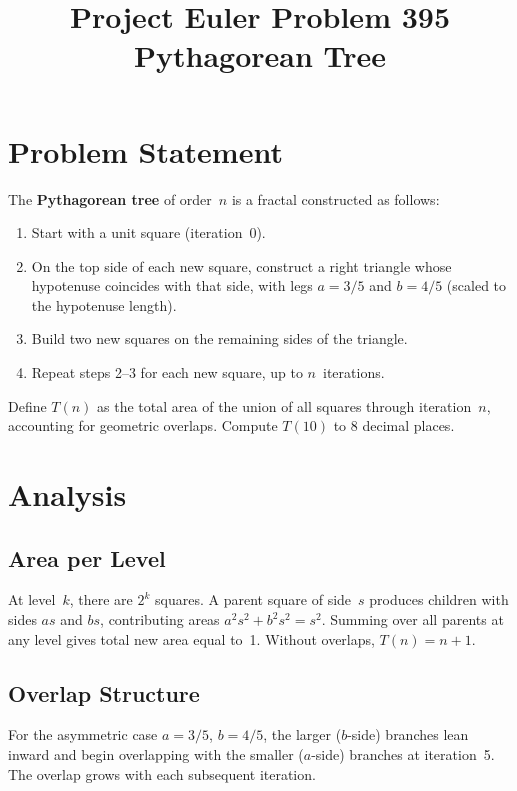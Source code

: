 \documentclass[11pt]{article}
\title{Project Euler Problem 395\\Pythagorean Tree}
\author{}
\date{}
\begin{document}
\maketitle

\section{Problem Statement}

The \textbf{Pythagorean tree} of order~$n$ is a fractal constructed as follows:
\begin{enumerate}
    \item Start with a unit square (iteration~0).
    \item On the top side of each new square, construct a right triangle whose
          hypotenuse coincides with that side, with legs $a = 3/5$ and $b = 4/5$
          (scaled to the hypotenuse length).
    \item Build two new squares on the remaining sides of the triangle.
    \item Repeat steps 2--3 for each new square, up to $n$~iterations.
\end{enumerate}

Define $T(n)$ as the total area of the union of all squares through
iteration~$n$, accounting for geometric overlaps. Compute $T(10)$ to 8
decimal places.

\section{Analysis}

\subsection{Area per Level}

At level~$k$, there are $2^k$ squares. A parent square of side~$s$ produces
children with sides $as$ and $bs$, contributing areas $a^2 s^2 + b^2 s^2 = s^2$.
Summing over all parents at any level gives total new area equal to~1. Without
overlaps, $T(n) = n + 1$.

\subsection{Overlap Structure}

For the asymmetric case $a = 3/5$, $b = 4/5$, the larger ($b$-side) branches
lean inward and begin overlapping with the smaller ($a$-side) branches at
iteration~5. The overlap grows with each subsequent iteration.
\end{document}
